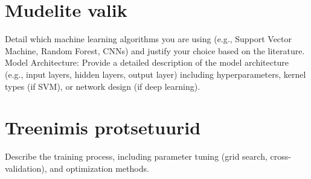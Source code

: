 


\section{Mudelite valik}
Detail which machine learning algorithms you are using (e.g., Support Vector Machine, Random Forest, CNNs) and justify your choice based on the literature.
Model Architecture: Provide a detailed description of the model architecture (e.g., input layers, hidden layers, output layer) including hyperparameters, kernel types (if SVM), or network design (if deep learning).
\section{Treenimis protsetuurid}
Describe the training process, including parameter tuning (grid search, cross-validation), and optimization methods.